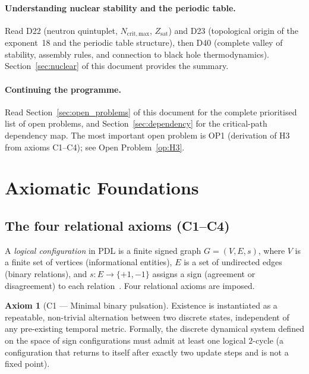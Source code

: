 \documentclass[11pt,a4paper]{article}
\theoremstyle{plain}
\theoremstyle{definition}
\newtheorem{axiom}[theorem]{Axiom}
\theoremstyle{remark}
\begin{document}
\paragraph{Understanding nuclear stability and the periodic table.}
Read D22 (neutron quintuplet, $N_{\mathrm{crit,max}}$, $Z_{\mathrm{sat}}$) and D23 (topological origin of the exponent~18 and the periodic table structure), then D40 (complete valley of stability, assembly rules, and connection to black hole thermodynamics).
Section~\ref{sec:nuclear} of this document provides the summary.

\paragraph{Continuing the programme.}
Read Section~\ref{sec:open_problems} of this document for the complete prioritised list of open problems, and Section~\ref{sec:dependency} for the critical-path dependency map.
The most important open problem is OP1 (derivation of H3 from axioms C1--C4); see Open Problem~\ref{op:H3}.

\section{Axiomatic Foundations}
\label{sec:axioms}

\subsection{The four relational axioms (C1--C4)}
\label{subsec:axioms}

A \emph{logical configuration} in PDL is a finite signed graph $G=(V,E,s)$, where $V$ is a finite set of vertices (informational entities), $E$ is a set of undirected edges (binary relations), and $s\colon E\to\{+1,-1\}$ assigns a sign (agreement or disagreement) to each relation~\citep{D01,D02}.
Four relational axioms are imposed.

\begin{axiom}[C1 — Minimal binary pulsation]
Existence is instantiated as a repeatable, non-trivial alternation between two discrete states, independent of any pre-existing temporal metric.
Formally, the discrete dynamical system defined on the space of sign configurations must admit at least one logical $2$-cycle (a configuration that returns to itself after exactly two update steps and is not a fixed point).
\end{axiom}
\end{document}

